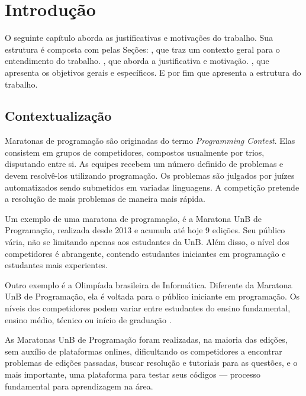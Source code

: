 \chapter{Introdução}

O seguinte capítulo aborda as justificativas e motivações do trabalho. Sua estrutura é composta com pelas Seções: 
, que traz um contexto geral para o entendimento do trabalho. 
, que aborda a justificativa e motivação. 
, que apresenta os objetivos gerais e específicos.
E por fim  que apresenta a estrutura do trabalho.

\section{Contextualização}
\label{sec:contextualizacao}

Maratonas de programação são originadas do termo \textit{Programming Contest}. Elas consistem em grupos de competidores, compostos usualmente por trios, disputando entre si. As equipes recebem um número definido de problemas e devem resolvê-los utilizando programação. Os problemas são julgados por juízes automatizados sendo submetidos em variadas linguagens. A competição pretende a resolução de mais problemas de maneira mais rápida.

Um exemplo de uma maratona de programação, é a Maratona UnB de Programação, realizada desde 2013 e acumula até hoje 9 edições. Seu público vária, não se limitando apenas aos estudantes da UnB. Além disso, o nível dos competidores é abrangente, contendo estudantes iniciantes em programação e estudantes mais experientes.

Outro exemplo é a Olimpíada brasileira de Informática. Diferente da Maratona UnB de Programação, ela é voltada para o público iniciante em programação. Os níveis dos competidores podem variar entre estudantes do ensino fundamental, ensino médio, técnico ou início de graduação \cite{obi2021:info}.

As Maratonas UnB de Programação foram realizadas, na maioria das edições, sem auxílio de plataformas onlines, dificultando os competidores a encontrar problemas de edições passadas, buscar resolução e tutoriais para as questões, e o mais importante, uma plataforma para testar seus códigos — processo fundamental para aprendizagem na área.

